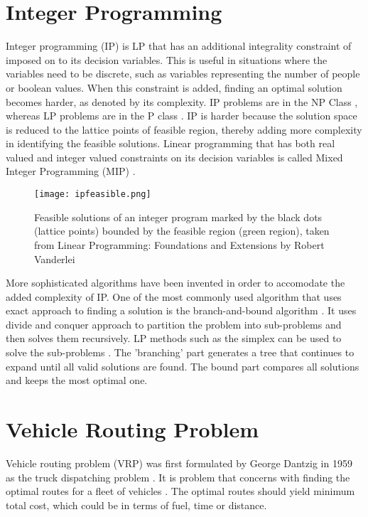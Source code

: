 \section{Integer Programming}
Integer programming (IP) \cite{LPVanderbei} is LP that has an additional
integrality constraint of imposed on to its decision variables. This is useful in situations where the variables need to be
discrete, such as variables representing the number of people or boolean values.
When this constraint is added, finding an optimal solution becomes harder, as denoted by its complexity.
IP problems are in the NP Class \cite{Papadimitriou1981}, whereas LP problems are in the P class \cite{Megiddo1987}.
 IP is harder because the solution space is reduced to
the lattice points of feasible region, thereby adding more complexity in identifying the feasible solutions.
Linear programming that has both real valued and integer valued constraints on its
 decision variables is called Mixed Integer Programming (MIP) \cite{LPVanderbei}.
\begin{figure}[!ht]
  \centering
    \texttt{[image: ipfeasible.png]}
    \caption{Feasible solutions of an integer program marked by the black dots (lattice points) bounded by the feasible region (green region), taken from
     Linear Programming: Foundations and Extensions by Robert Vanderlei \cite{Sottinen2009}}
\end{figure}

More sophisticated algorithms have been invented in order to accomodate the added complexity of IP. One of the most commonly
used algorithm that uses exact approach to finding a solution is the branch-and-bound algorithm  \cite{LPVanderbei, LPChvatal, Dastghaibifard2008}. It uses divide and
conquer approach to partition the problem into sub-problems
and then solves them recursively. LP methods such as the simplex can be used to solve the sub-problems \cite{Dastghaibifard2008}.
The 'branching' part generates a tree
that continues to expand until all valid solutions are found. The bound part compares all solutions and keeps the
most optimal one.

\section{Vehicle Routing Problem}
Vehicle routing problem (VRP) was first formulated by George Dantzig in 1959 as the truck dispatching problem \cite{Dantzig1959}.
It is problem that concerns with finding the optimal routes for a fleet of vehicles \cite{Dantzig1959, Daneshzand2011}.
The optimal routes should yield minimum total cost, which could be in terms of fuel, time or distance.

